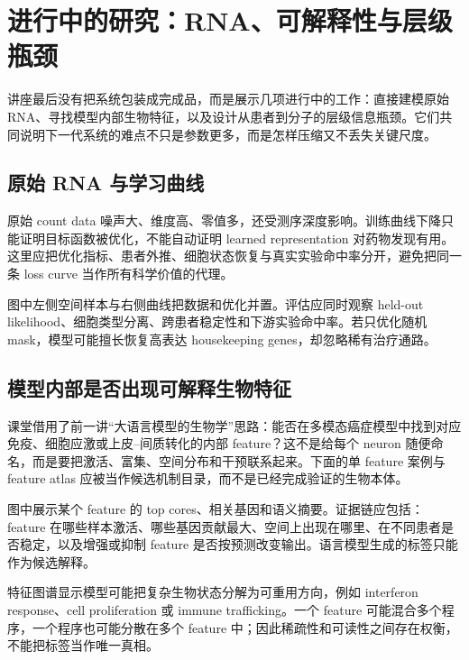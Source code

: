 \section{进行中的研究：RNA、可解释性与层级瓶颈}

讲座最后没有把系统包装成完成品，而是展示几项进行中的工作：直接建模原始 RNA、寻找模型内部生物特征，以及设计从患者到分子的层级信息瓶颈。它们共同说明下一代系统的难点不只是参数更多，而是怎样压缩又不丢失关键尺度。

\subsection{原始 RNA 与学习曲线}

原始 count data 噪声大、维度高、零值多，还受测序深度影响。训练曲线下降只能证明目标函数被优化，不能自动证明 learned representation 对药物发现有用。这里应把优化指标、患者外推、细胞状态恢复与真实实验命中率分开，避免把同一条 loss curve 当作所有科学价值的代理。


图中左侧空间样本与右侧曲线把数据和优化并置。评估应同时观察 held-out likelihood、细胞类型分离、跨患者稳定性和下游实验命中率。若只优化随机 mask，模型可能擅长恢复高表达 housekeeping genes，却忽略稀有治疗通路。

\subsection{模型内部是否出现可解释生物特征}

课堂借用了前一讲“大语言模型的生物学”思路：能否在多模态癌症模型中找到对应免疫、细胞应激或上皮--间质转化的内部 feature？这不是给每个 neuron 随便命名，而是要把激活、富集、空间分布和干预联系起来。下面的单 feature 案例与 feature atlas 应被当作候选机制目录，而不是已经完成验证的生物本体。


图中展示某个 feature 的 top cores、相关基因和语义摘要。证据链应包括：feature 在哪些样本激活、哪些基因贡献最大、空间上出现在哪里、在不同患者是否稳定，以及增强或抑制 feature 是否按预测改变输出。语言模型生成的标签只能作为候选解释。


特征图谱显示模型可能把复杂生物状态分解为可重用方向，例如 interferon response、cell proliferation 或 immune trafficking。一个 feature 可能混合多个程序，一个程序也可能分散在多个 feature 中；因此稀疏性和可读性之间存在权衡，不能把标签当作唯一真相。

